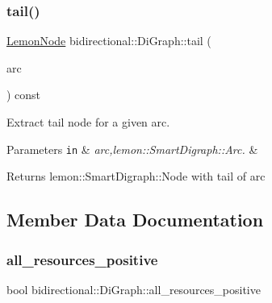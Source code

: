 \subsubsection{\texorpdfstring{tail()}{tail()}}
{\footnotesize\ttfamily \hyperlink{digraph_8h_a952c6b935f7521c3435dbd13b255246b}{Lemon\+Node} bidirectional\+::\+Di\+Graph\+::tail (\begin{DoxyParamCaption}\item[{const \hyperlink{digraph_8h_a0f10c67f03c054baec3e3bab6a92171e}{Lemon\+Arc} \&}]{arc }\end{DoxyParamCaption}) const\hspace{0.3cm}{\ttfamily [inline]}}

Extract tail node for a given arc.


\begin{DoxyParams}[1]{Parameters}
\mbox{\tt in}  & {\em arc,lemon\+::\+Smart\+Digraph\+::\+Arc.} & \\
\hline
\end{DoxyParams}
\begin{DoxyReturn}{Returns}
lemon\+::\+Smart\+Digraph\+::\+Node with tail of arc 
\end{DoxyReturn}


\subsection{Member Data Documentation}
\mbox{\label{classbidirectional_1_1DiGraph_ae31e98d4867f98174ec40f911d6be14e}} 
\subsubsection{\texorpdfstring{all\+\_\+resources\+\_\+positive}{all\_resources\_positive}}
{\footnotesize\ttfamily bool bidirectional\+::\+Di\+Graph\+::all\+\_\+resources\+\_\+positive}

\mbox{\label{classbidirectional_1_1DiGraph_a8acd5e0889d880b5b98d1c67a356c4e2}} 
